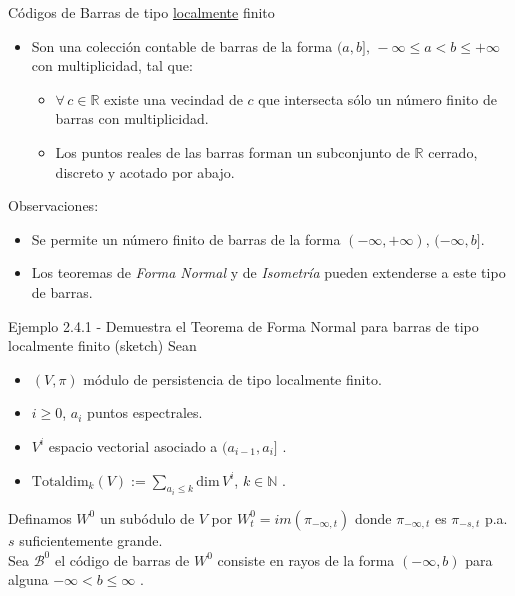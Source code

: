 \documentclass{beamer}
\begin{document}
\begin{frame}{C\'odigos de Barras de tipo \underline{localmente} finito}
\begin{itemize}
\item Son una colecci\'on contable de barras de la forma $(a,b],\, -\infty\leq a <b\leq +\infty$ con multiplicidad, tal que:\\
\vspace{1em}
\begin{itemize}
\item $\forall\,c\in\mathbb{R}$ existe una vecindad de $c$ que intersecta s\'olo un n\'umero finito de barras con multiplicidad.
\vspace{0.5em}
\item Los puntos reales de las barras forman un subconjunto de $\mathbb{R}$ cerrado, discreto y acotado por abajo.
\end{itemize}
\end{itemize}
\begin{block}{Observaciones:}
\begin{itemize}
\item Se permite un n\'umero finito de barras de la forma $(-\infty,+\infty),\, (-\infty,b]$.\\
\item Los teoremas de \emph{Forma Normal} y de \emph{Isometr\'ia} pueden extenderse a este tipo de barras.
\end{itemize}
\end{block}
\end{frame}


\begin{frame}{Ejemplo 2.4.1 - Demuestra el Teorema de Forma Normal para barras de tipo localmente finito} {(sketch)}
Sean
\begin{itemize}
\item $(V,\pi)$ m\'odulo de persistencia de tipo localmente finito.
\item $i\geq 0$, $a_{i}$ puntos espectrales.
\item $V^i$ espacio vectorial asociado a $(a_{i-1},a_{i}]$ .
\item $\mbox{Totaldim}_{k}(V):=\sum_{a_{i}\leq k}\mbox{dim}\,V^{i}$, $k\in \mathbb{N}$ .
\end{itemize}
\vspace{1em}
Definamos $W^0$ un sub\'odulo de $V$ por $W^0_t=im(\pi_{-\infty,t})$ donde $\pi_{-\infty,t}$ es $\pi_{-s,t}$ p.a. $s$ suficientemente grande.\\

Sea $\mathcal{B}^0 $ el c\'odigo de barras de $W^0$ consiste en rayos de la forma $(-\infty,b)$ para alguna $-\infty<b\leq\infty$ .
\end{frame}
\end{document}
